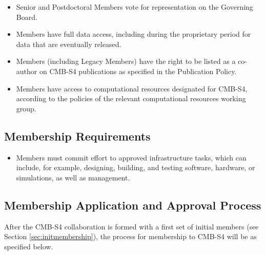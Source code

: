 \begin{itemize}

\item Senior and Postdoctoral Members vote for representation on the Governing Board.  

\item Members have full data access, including during the proprietary period for data that are eventually released.

\item Members (including Legacy Members) have the right to be listed as a co-author on CMB-S4 publications as specified in the Publication Policy.

\item Members have access to computational resources designated for CMB-S4, according to the policies of the relevant computational resources working group.

\end{itemize}

\subsection{Membership Requirements}
\begin{itemize}

\item Members must commit effort to approved infrastructure tasks, which can include, for example, designing, building, and testing software, hardware, or simulations, as well as management. 

\end{itemize}

\subsection{Membership Application and Approval Process}
After the CMB-S4 collaboration is formed with a first set of initial members (see Section \ref{sec:initmembership}), the process for membership to CMB-S4 will be as specified below.

